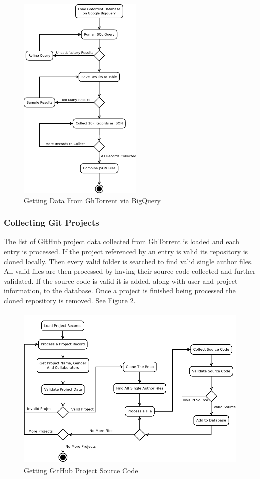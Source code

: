 \documentclass{article}
\begin{document}
\begin{figure}[t]
    \centering
    \includegraphics[height=10cm]{diagrams/ght_process.png}
    \caption{Getting Data From GhTorrent via BigQuery}
\end{figure}

\subsubsection*{Collecting Git Projects}
The list of GitHub project data collected from GhTorrent is loaded and each entry is processed. If the project referenced by an entry is valid its repository is cloned locally. Then every valid folder is searched to find valid single author files. All valid files are then processed by having their source code collected and further validated. If the source code is valid it is added, along with user and project information, to the database. Once a project is finished being processed the cloned repository is removed. See Figure 2.

\begin{figure}[t]
    \centering
    \includegraphics[height=8cm]{diagrams/projects.png}
    \caption{Getting GitHub Project Source Code}
\end{figure}
\end{document}
